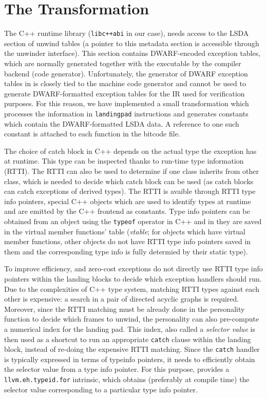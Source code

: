 \section{The \llvm{} Transformation}\label{sec:lang:transform}

The C++ runtime library (\texttt{libc++abi} in our case), needs access
to the LSDA section of unwind tables (a pointer to this metadata section
is accessible through the unwinder interface). This section contains
DWARF-encoded exception tables, which are normally generated together
with the executable by the compiler backend (code generator).
Unfortunately, the generator of DWARF exception tables in \llvm{} is
closely tied to the machine code generator and cannot be used to
generate DWARF-formatted exception tables for the \llvm{} IR used for
verification purposes.
For
this reason, we have implemented a small \llvm{} transformation which
processes the information in \texttt{landingpad} instructions and
generates \llvm{} constants which contain the DWARF-formatted LSDA data. A
reference to one such constant is attached to each function in the
bitcode file.

The choice of catch block in C++ depends on the actual type the exception has
at runtime.
This type can be inspected thanks to run-time type information (RTTI).
The RTTI can also be used to determine if one class inherits from other class,
which is needed to decide which catch block can be used (as catch blocks can
catch exceptions of derived types).
The RTTI is avaible through RTTI type info pointers, special C++ objects which
are used to identify types at runtime and are emitted by the C++ frontend as
constants. 
Type info pointers can be obtained from an object using the \texttt{typeof}
operator in C++ and in \llvm{} they are saved in the virtual member functions'
table (\emph{vtable}; for objects which have virtual member functions, other
objects do not have RTTI type info pointers saved in them and the corresponding
type info is fully determied by their static type).

To improve efficiency, \llvm{} and zero-cost exceptions do not directly use
RTTI type info pointers within the landing blocks to decide which exception
handlers should run.
Due to the complexities of C++ type system, matching RTTI
types against each other is expensive: a search in a pair of directed
acyclic graphs is required. Moreover, since the RTTI matching must be
already done in the personality function to decide which frames to
unwind, the personality can also pre-compute a numerical index for the
landing pad. This index, also called a \emph{selector value} is then
used as a shortcut to run an appropriate \texttt{catch} clause within
the landing block, instead of re-doing the expensive RTTI matching.
Since the \texttt{catch} handler is typically expressed in terms of
typeinfo pointers, it needs to efficiently obtain the selector value
from a type info pointer. For this purpose, \llvm{} provides a
\texttt{llvm.eh.typeid.for} intrinsic, which obtains (preferably at
compile time) the selector value corresponding to a particular type info
pointer.

